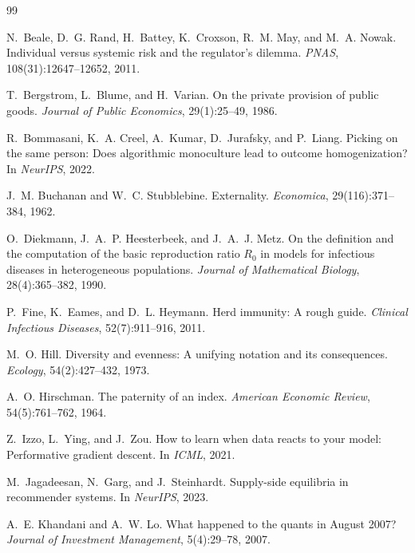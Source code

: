 \documentclass{article}
\theoremstyle{plain}
\theoremstyle{definition}
\begin{document}
\begin{thebibliography}{99}
\small

 N.~Beale, D.~G. Rand, H.~Battey, K.~Croxson, R.~M. May, and M.~A. Nowak. Individual versus systemic risk and the regulator's dilemma. \emph{PNAS}, 108(31):12647--12652, 2011.

 T.~Bergstrom, L.~Blume, and H.~Varian. On the private provision of public goods. \emph{Journal of Public Economics}, 29(1):25--49, 1986.

 R.~Bommasani, K.~A. Creel, A.~Kumar, D.~Jurafsky, and P.~Liang. Picking on the same person: Does algorithmic monoculture lead to outcome homogenization? In \emph{NeurIPS}, 2022.

 J.~M. Buchanan and W.~C. Stubblebine. Externality. \emph{Economica}, 29(116):371--384, 1962.

 O.~Diekmann, J.~A.~P. Heesterbeek, and J.~A.~J. Metz. On the definition and the computation of the basic reproduction ratio $R_0$ in models for infectious diseases in heterogeneous populations. \emph{Journal of Mathematical Biology}, 28(4):365--382, 1990.

 P.~Fine, K.~Eames, and D.~L. Heymann. Herd immunity: A rough guide. \emph{Clinical Infectious Diseases}, 52(7):911--916, 2011.

 M.~O. Hill. Diversity and evenness: A unifying notation and its consequences. \emph{Ecology}, 54(2):427--432, 1973.

 A.~O. Hirschman. The paternity of an index. \emph{American Economic Review}, 54(5):761--762, 1964.

 Z.~Izzo, L.~Ying, and J.~Zou. How to learn when data reacts to your model: Performative gradient descent. In \emph{ICML}, 2021.

 M.~Jagadeesan, N.~Garg, and J.~Steinhardt. Supply-side equilibria in recommender systems. In \emph{NeurIPS}, 2023.

 A.~E. Khandani and A.~W. Lo. What happened to the quants in August 2007? \emph{Journal of Investment Management}, 5(4):29--78, 2007.


\end{thebibliography}
\end{document}
